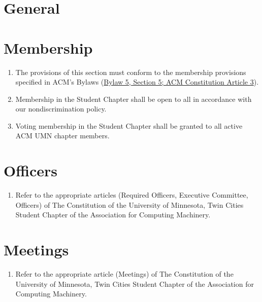





\section{General}



\section{Membership}
\begin{enumerate}
	\item The provisions of this section must conform to the membership provisions specified in ACM's Bylaws (\href{https://www.acm.org/governance/acm-bylaws#h-section-5.-membership.}{Bylaw 5, Section 5; ACM Constitution Article 3}).
	\item Membership in the Student Chapter shall be open to all in accordance with our nondiscrimination policy.
	\item Voting membership in the Student Chapter shall be granted to all active ACM UMN chapter members.
\end{enumerate}

\section{Officers}
\begin{enumerate}
	\item Refer to the appropriate articles (Required Officers, Executive Committee, Officers) of The Constitution of the University of Minnesota, Twin Cities Student Chapter of the Association for Computing Machinery.
\end{enumerate}

\section{Meetings}
\begin{enumerate}
	\item Refer to the appropriate article (Meetings) of The Constitution of the University of Minnesota, Twin Cities Student Chapter of the Association for Computing Machinery.
\end{enumerate}

